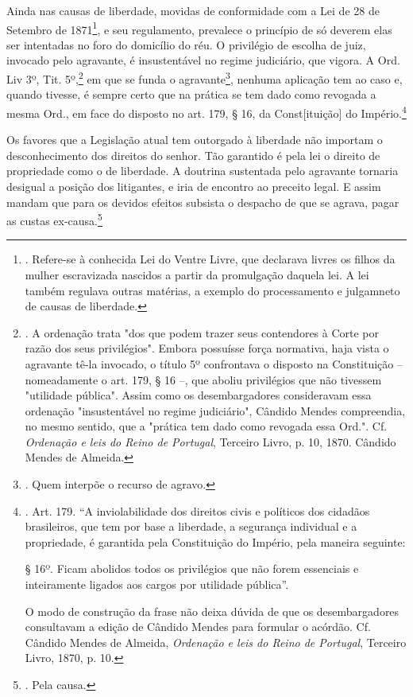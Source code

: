 Ainda nas causas de liberdade, movidas de conformidade com a Lei de 28
de Setembro de 1871\footnote{. Refere-se à conhecida Lei do Ventre
  Livre, que declarava livres os filhos da mulher escravizada nascidos a
  partir da promulgação daquela lei. A lei também regulava outras
  matérias, a exemplo do processamento e julgamneto de causas de
  liberdade.}, e seu regulamento, prevalece o princípio de só deverem
elas ser intentadas no foro do domicílio do réu. O privilégio de escolha
de juiz, invocado pelo agravante, é insustentável no regime judiciário,
que vigora. A Ord. Liv 3º, Tit. 5º,\footnote{. A ordenação trata "dos
  que podem trazer seus contendores à Corte por razão dos seus
  privilégios". Embora possuísse força normativa, haja vista o agravante
  tê-la invocado, o título 5º confrontava o disposto na Constituição --
  nomeadamente o art. 179, § 16 --, que aboliu privilégios que não
  tivessem "utilidade pública". Assim como os desembargadores
  consideravam essa ordenação "insustentável no regime judiciário",
  Cândido Mendes compreendia, no mesmo sentido, que a "prática tem dado
  como revogada essa Ord.". Cf. \emph{Ordenação e leis do Reino de
  Portugal}, Terceiro Livro, p. 10, 1870. Cândido Mendes de Almeida.} em
que se funda o agravante\footnote{. Quem interpõe o recurso de agravo.},
nenhuma aplicação tem ao caso e, quando tivesse, é sempre certo que na
prática se tem dado como revogada a mesma Ord., em face do disposto no
art. 179, § 16, da Const{[}ituição{]} do Império.\footnote{. Art. 179.
  ``A inviolabilidade dos direitos civis e políticos dos cidadãos
  brasileiros, que tem por base a liberdade, a segurança individual e a
  propriedade, é garantida pela Constituição do Império, pela maneira
  seguinte:

  § 16º. Ficam abolidos todos os privilégios que não forem essenciais e
  inteiramente ligados aos cargos por utilidade pública''.

  O modo de construção da frase não deixa dúvida de que os
  desembargadores consultavam a edição de Cândido Mendes para formular o
  acórdão. Cf. Cândido Mendes de Almeida, \emph{Ordenação e leis do
  Reino de Portugal}, Terceiro Livro, 1870, p. 10.}

Os favores que a Legislação atual tem outorgado à liberdade não importam
o desconhecimento dos direitos do senhor. Tão garantido é pela lei o
direito de propriedade como o de liberdade. A doutrina sustentada pelo
agravante tornaria desigual a posição dos litigantes, e iria de encontro
ao preceito legal. E assim mandam que para os devidos efeitos subsista o
despacho de que se agrava, pagar as custas ex-causa.\footnote{. Pela
  causa.}

